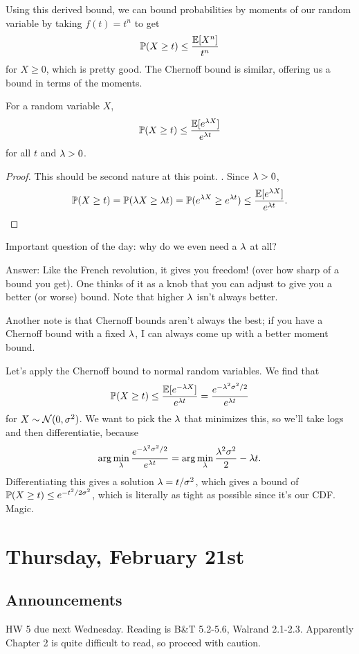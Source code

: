 \documentclass[11 pt]{scrartcl}
\begin{document}
Using this derived bound, we can bound probabilities by moments of our random variable by taking $f(t) = t^n$ to get  
    \[ \mathbb P(X \geq t) \leq \dfrac{\mathbb E[X^n]}{t^n}\] 
for $X\geq 0$, which is pretty good. The Chernoff bound is similar, offering us a bound in terms of the moments. 

\begin{theorem}
    For a random variable $X$, 
    \[ \mathbb P(X\geq t) \leq \dfrac{\mathbb E[e^{\lambda X}]}{e^{\lambda t}}\]
    for all $t$ and $\lambda > 0$.
\end{theorem}
\begin{proof}
    This should be second nature at this point. . Since $\lambda > 0$, 
    \[ \mathbb P(X\geq t) = \mathbb P(\lambda X \geq \lambda t) = \mathbb P(e^{\lambda X} \geq e^{\lambda t}) \leq \dfrac{\mathbb E[e^{\lambda X}]}{e^{\lambda t}}.\] 
\end{proof}

Important question of the day: why do we even need a $\lambda$ at all? 

Answer: Like the French revolution, it gives you freedom! (over how sharp of a bound you get). One thinks of it as a knob that you can adjust to give you a better (or worse) bound. Note that higher $\lambda$ isn't always better. 

Another note is that Chernoff bounds aren't always the best; if you have a Chernoff bound with a fixed $\lambda$, I can always come up with a better moment bound. 

\begin{example}
    Let's apply the Chernoff bound to normal random variables. We find that 
\[ \mathbb P(X\geq t) \leq \dfrac{\mathbb E[e^{-\lambda X}]}{e^{\lambda t}} = \dfrac{e^{-\lambda^2\sigma^2/2}}{e^{\lambda t}}\] 
for $X\sim \mathcal{N}(0, \sigma^2)$. We want to pick the $\lambda$ that minimizes this, so we'll take logs and then differentiatie, because 
\[ \arg\min_\lambda \dfrac{e^{-\lambda^2\sigma^2/2}}{e^{\lambda t}} = \arg\min_\lambda \dfrac{\lambda^2\sigma^2}{2} - \lambda t.\] 
    Differentiating this gives a solution $\lambda  = t/\sigma^2$, which gives a bound of $\mathbb P(X\geq t) \leq e^{-t^2/2\sigma^2}$, which is literally as tight as possible since it's our CDF. Magic. 
\end{example}

\newpage
\section{Thursday, February 21st}
\subsection{Announcements}
HW 5 due next Wednesday. Reading is B\&T 5.2-5.6, Walrand 2.1-2.3. Apparently Chapter 2 is quite difficult to read, so proceed with caution. %
\end{document}
